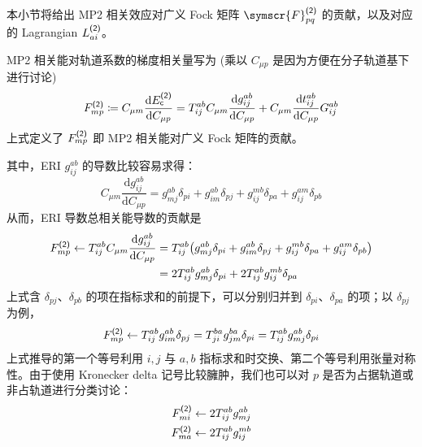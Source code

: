 本小节将给出 MP2 相关效应对广义 Fock 矩阵 $\symscr{F}_{pq}^\textmt{(2)}$ 的贡献，以及对应的 Lagrangian $L_{ai}^{\textsf{(2)}}$。

MP2 相关能对轨道系数的梯度相关量写为 (乘以 $C_{\mu p}$ 是因为方便在分子轨道基下进行讨论)
\begin{equation}
    \label{eq.3.def-fock-cmp2}
    F_{mp}^{\textsf{(2)}} \coloneq C_{\mu m} \frac{\mathrm{d} E_{\textsf{c}}^{\textsf{(2)}}}{\mathrm{d} C_{\mu p}} = T_{ij}^{ab} C_{\mu m} \frac{\mathrm{d} g_{ij}^{ab}}{\mathrm{d} C_{\mu p}} + C_{\mu m} \frac{\mathrm{d} t_{ij}^{ab}}{\mathrm{d} C_{\mu p}} G_{ij}^{ab}
\end{equation}
上式定义了 $F_{mp}^{\textsf{(2)}}$ 即 MP2 相关能对广义 Fock 矩阵的贡献。

其中，ERI $g_{ij}^{ab}$ 的导数比较容易求得：
\begin{equation}
    C_{\mu m} \frac{\mathrm{d} g_{ij}^{ab}}{\mathrm{d} C_{\mu p}} = g_{mj}^{ab} \delta_{pi} + g_{im}^{ab} \delta_{pj} + g_{ij}^{mb} \delta_{pa} + g_{ij}^{am} \delta_{pb}
\end{equation}
从而，ERI 导数总相关能导数的贡献是
\begin{align}
    F_{mp}^{\textsf{(2)}} \leftarrow T_{ij}^{ab} C_{\mu m} \frac{\mathrm{d} g_{ij}^{ab}}{\mathrm{d} C_{\mu p}} &= T_{ij}^{ab} \big( g_{mj}^{ab} \delta_{pi} + g_{im}^{ab} \delta_{pj} + g_{ij}^{mb} \delta_{pa} + g_{ij}^{am} \delta_{pb} \big) \notag\\
    &= 2 T_{ij}^{ab} g_{mj}^{ab} \delta_{pi} + 2 T_{ij}^{ab} g_{ij}^{mb} \delta_{pa}
\end{align}
上式含 $\delta_{pj}$、$\delta_{pb}$ 的项在指标求和的前提下，可以分别归并到 $\delta_{pi}$、$\delta_{pa}$ 的项；以 $\delta_{pj}$ 为例，
\begin{align*}
    F_{mp}^{\textsf{(2)}} \leftarrow T_{ij}^{ab} g_{im}^{ab} \delta_{pj} = T_{ji}^{ba} g_{jm}^{ba} \delta_{pi} = T_{ij}^{ab} g_{mj}^{ab} \delta_{pi}
\end{align*}
上式推导的第一个等号利用 $i, j$ 与 $a, b$ 指标求和时交换、第二个等号利用张量对称性。由于使用 Kronecker delta 记号比较臃肿，我们也可以对 $p$ 是否为占据轨道或非占轨道进行分类讨论：
\begin{align}
    \label{eq.3.fock-cmp2-part1-mi}
    F_{mi}^{\textsf{(2)}} &\leftarrow 2 T_{ij}^{ab} g_{mj}^{ab} \\
    \label{eq.3.fock-cmp2-part1-ma}
    F_{ma}^{\textsf{(2)}} &\leftarrow 2 T_{ij}^{ab} g_{ij}^{mb}
\end{align}

